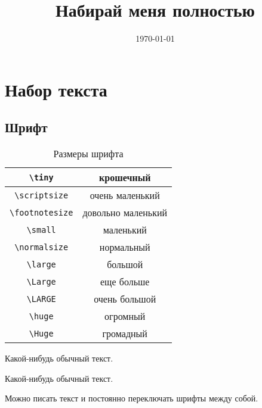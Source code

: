 \documentclass[12pt, a4paper]{article}
\title{Набирай меня полностью}
\date{\today}
\begin{document}

\maketitle

\tableofcontents

\section{Набор текста}

\subsection{Шрифт}

\begin{table}[h!]
	\caption{Размеры шрифта}
	\centering
		\begin{tabular}{|c|c|}
		\hline	\verb|\tiny|      & \tiny        крошечный \\
		\hline	\verb|\scriptsize|   & \scriptsize  очень маленький\\
			\hline \verb|\footnotesize| & \footnotesize  довольно маленький \\
			\hline \verb|\small|        &  \small        маленький \\
			\hline \verb|\normalsize|   &  \normalsize  нормальный \\
			\hline \verb|\large|        &  \large       большой \\
			\hline \verb|\Large|        &  \Large       еще больше \\[5pt]
			\hline \verb|\LARGE|        &  \LARGE       очень большой \\[5pt]
			\hline \verb|\huge|         &  \huge        огромный \\[5pt]
			\hline \verb|\Huge|         &  \Huge        громадный \\ \hline
		\end{tabular}
\end{table}

{ \Huge  Какой-нибудь обычный текст.}

\begin{Huge}
Какой-нибудь обычный текст.
\end{Huge}

\vspace{1cm}

Можно писать текст и \LARGE постоянно переключать \tiny шрифты между \normalsize собой.
\end{document}
